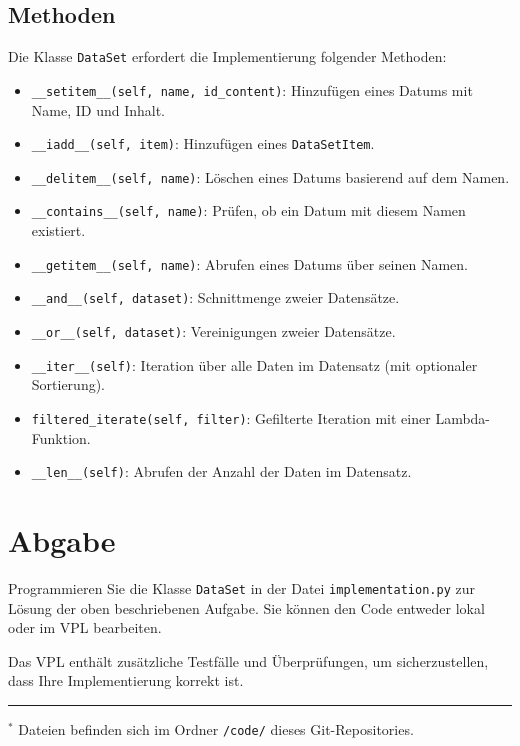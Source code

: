 \documentclass[a4paper,12pt]{article}
\begin{document}
\subsection{Methoden}
Die Klasse \texttt{DataSet} erfordert die Implementierung folgender Methoden:
\begin{itemize}[leftmargin=1.5cm]
    \item[\textbullet] \texttt{\_\_setitem\_\_(self, name, id\_content)}: Hinzufügen eines Datums mit Name, ID und Inhalt.
    \item[\textbullet] \texttt{\_\_iadd\_\_(self, item)}: Hinzufügen eines \texttt{DataSetItem}.
    \item[\textbullet] \texttt{\_\_delitem\_\_(self, name)}: Löschen eines Datums basierend auf dem Namen.
    \item[\textbullet] \texttt{\_\_contains\_\_(self, name)}: Prüfen, ob ein Datum mit diesem Namen existiert.
    \item[\textbullet] \texttt{\_\_getitem\_\_(self, name)}: Abrufen eines Datums über seinen Namen.
    \item[\textbullet] \texttt{\_\_and\_\_(self, dataset)}: Schnittmenge zweier Datensätze.
    \item[\textbullet] \texttt{\_\_or\_\_(self, dataset)}: Vereinigungen zweier Datensätze.
    \item[\textbullet] \texttt{\_\_iter\_\_(self)}: Iteration über alle Daten im Datensatz (mit optionaler Sortierung).
    \item[\textbullet] \texttt{filtered\_iterate(self, filter)}: Gefilterte Iteration mit einer Lambda-Funktion.
    \item[\textbullet] \texttt{\_\_len\_\_(self)}: Abrufen der Anzahl der Daten im Datensatz.
\end{itemize}

\section{Abgabe}

Programmieren Sie die Klasse \texttt{DataSet} in der Datei \texttt{implementation.py} zur Lösung der oben beschriebenen Aufgabe. Sie können den Code entweder lokal oder im VPL bearbeiten.

Das VPL enthält zusätzliche Testfälle und Überprüfungen, um sicherzustellen, dass Ihre Implementierung korrekt ist.

\begin{flushright}
    \hrule\vspace{0.2cm}
    \footnotesize{$^*$ Dateien befinden sich im Ordner \texttt{/code/} dieses Git-Repositories.}
\end{flushright}
\end{document}
